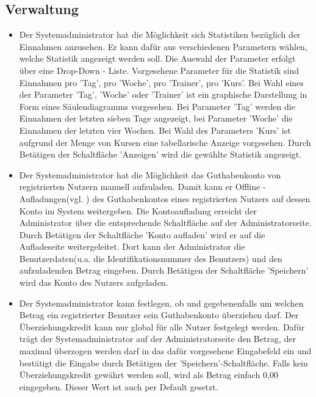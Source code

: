 \documentclass[a4paper]{scrreprt}
\begin{document}
\subsection{Verwaltung}
\begin{itemize}
	\item {}
	Der Systemadministrator hat die Möglichkeit sich Statistiken bezüglich der Einnahmen anzusehen. Er kann dafür aus verschiedenen Parametern wählen, welche Statistik angezeigt werden soll. Die Auswahl der Parameter erfolgt über eine Drop-Down - Liste. Vorgesehene Parameter für die Statistik sind Einnahmen pro 'Tag', pro 'Woche', pro 'Trainer', pro 'Kurs'. Bei Wahl eines der Parameter 'Tag', 'Woche' oder 'Trainer' ist ein graphische Darstellung in Form eines Säulendiagramms vorgesehen. Bei Parameter 'Tag' werden die Einnahmen der letzten sieben Tage angezeigt, bei Parameter 'Woche' die Einnahmen der letzten vier Wochen. Bei Wahl des Parameters 'Kurs' ist aufgrund der Menge von Kursen eine tabellarische Anzeige vorgesehen. Durch Betätigen der Schaltfläche 'Anzeigen' wird die gewählte Statistik angezeigt.
	\item {}
	Der Systemadministrator hat die Möglichkeit das Guthabenkonto von  registrierten Nutzern manuell aufzuladen. Damit kann er \glqq Offline - Aufladungen\grqq (vgl. ) des Guthabenkontos eines registrierten Nutzers auf dessen Konto im System weitergeben. Die Kontoaufladung erreicht der Administrator über die entsprechende Schaltfläche auf der Administratorseite. Durch Betätigen der Schaltfläche 'Konto aufladen' wird er auf die Aufladeseite weitergeleitet. Dort kann der Administrator die Benutzerdaten(u.a. die Identifikationsnummer des Benutzers) und den aufzuladenden Betrag eingeben. Durch Betätigen der Schaltfläche 'Speichern' wird das Konto des Nutzers aufgeladen.
	\item {}
	Der Systemadministrator kann festlegen, ob und gegebenenfalls um welchen Betrag ein registrierter Benutzer sein Guthabenkonto überziehen darf. Der Überziehungskredit kann nur global für alle Nutzer festgelegt werden. Dafür trägt der Systemadministrator auf der Administratorseite den Betrag, der maximal überzogen werden darf in das dafür vorgesehene Eingabefeld ein und bestätigt die Eingabe durch Betätigen der 'Speichern'-Schaltfläche.
	Falls kein Überziehungskredit gewährt werden soll, wird als Betrag einfach 0,00 eingegeben. Dieser Wert ist auch per Default gesetzt.
\end{itemize}
\end{document}
